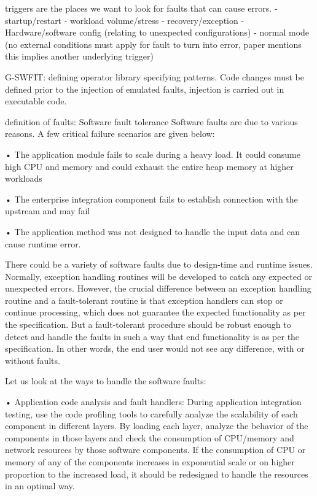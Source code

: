 triggers are the places we want to look for faults that can cause errors.
- startup/restart
- workload volume/stress
- recovery/exception 
- Hardware/software config (relating to unexpected configurations)
- normal mode (no external conditions must apply for fault to turn into error, paper mentions this implies another underlying trigger)
\cite{christmansson1996generation}


G-SWFIT: defining operator library specifying patterns. Code changes must be defined prior to the injection of emulated faults, injection is carried out in executable code. \cite{duraes2006emulation}












definition of faults: \cite{shivakumar2014architecting}
Software fault tolerance
Software faults are due to various reasons. A few critical failure scenarios are given below:

• The application module fails to scale during a heavy load. It could consume high CPU and memory and could exhaust the entire heap memory at higher workloads

• The enterprise integration component fails to establish connection with the upstream and may fail

• The application method was not designed to handle the input data and can cause runtime error.

There could be a variety of software faults due to design-time and runtime issues. Normally, exception handling routines will be developed to catch any expected or unexpected errors. However, the crucial difference between an exception handling routine and a fault-tolerant routine is that exception handlers can stop or continue processing, which does not guarantee the expected functionality as per the specification. But a fault-tolerant procedure should be robust enough to detect and handle the faults in such a way that end functionality is as per the specification. In other words, the end user would not see any difference, with or without faults.

Let us look at the ways to handle the software faults:

• Application code analysis and fault handlers: During application integration testing, use the code profiling tools to carefully analyze the scalability of each component in different layers. By loading each layer, analyze the behavior of the components in those layers and check the consumption of CPU/memory and network resources by those software components. If the consumption of CPU or memory of any of the components increases in exponential scale or on higher proportion to the increased load, it should be redesigned to handle the resources in an optimal way.

